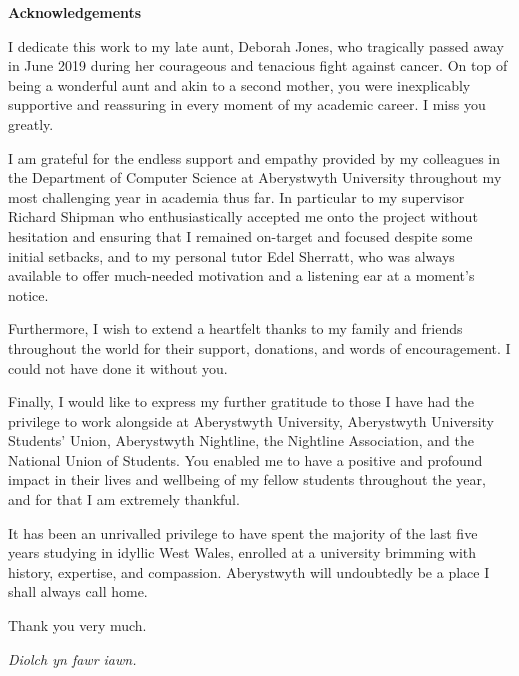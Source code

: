 \thispagestyle{empty}


\begin{center}
    {\LARGE\bf Acknowledgements}
\end{center}

\noindent I dedicate this work to my late aunt, Deborah Jones, who tragically passed away in June 2019 during her courageous and tenacious fight against cancer. On top of being a wonderful aunt and akin to a second mother, you were inexplicably supportive and reassuring in every moment of my academic career. I miss you greatly.

\noindent I am grateful for the endless support and empathy provided by my colleagues in the Department of Computer Science at Aberystwyth University throughout my most challenging year in academia thus far. In particular to my supervisor Richard Shipman who enthusiastically accepted me onto the project without hesitation and ensuring that I remained on-target and focused despite some initial setbacks, and to my personal tutor Edel Sherratt, who was always available to offer much-needed motivation and a listening ear at a moment's notice.

\noindent Furthermore, I wish to extend a heartfelt thanks to my family and friends throughout the world for their support, donations, and words of encouragement. I could not have done it without you.

\noindent Finally, I would like to express my further gratitude to those I have had the privilege to work alongside at Aberystwyth University, Aberystwyth University Students' Union, Aberystwyth Nightline, the Nightline Association, and the National Union of Students. You enabled me to have a positive and profound impact in their lives and wellbeing of my fellow students throughout the year, and for that I am extremely thankful.

\noindent It has been an unrivalled privilege to have spent the majority of the last five years studying in idyllic West Wales, enrolled at a university brimming with history, expertise, and compassion. Aberystwyth will undoubtedly be a place I shall always call home.

\vspace{15mm}

\begin{center}
\noindent Thank you very much.

\noindent \textit{Diolch yn fawr iawn.}
\end{center}

